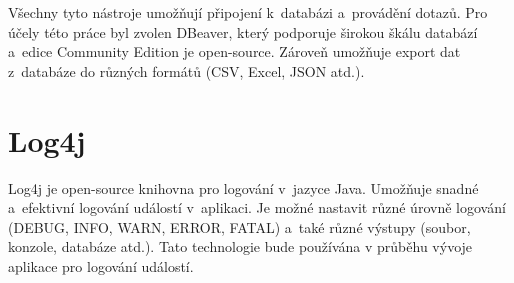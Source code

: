 Všechny tyto nástroje umožňují připojení k~databázi a~provádění dotazů.
Pro účely této práce byl zvolen DBeaver, který podporuje širokou škálu databází a~edice Community Edition je open-source.
Zároveň umožňuje export dat z~databáze do různých formátů (CSV, Excel, JSON atd.).
\cite{dbeaver}

\section{Log4j}
Log4j je open-source knihovna pro logování v~jazyce Java.
Umožňuje snadné a~efektivní logování událostí v~aplikaci.
Je možné nastavit různé úrovně logování (DEBUG, INFO, WARN, ERROR, FATAL) a~také různé výstupy
(soubor, konzole, databáze atd.).
Tato technologie bude používána v průběhu vývoje aplikace pro logování událostí.
\cite{log4j}